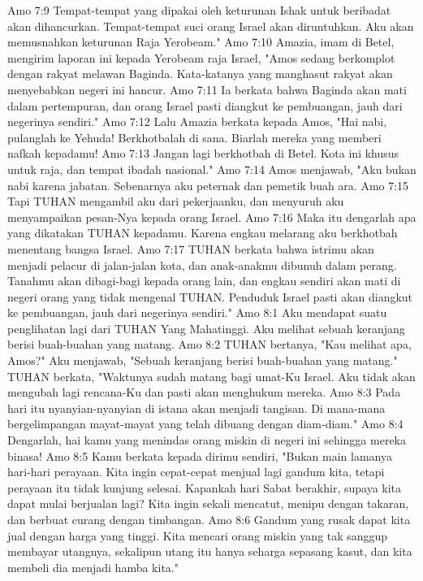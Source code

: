 Amo 7:9  Tempat-tempat yang dipakai oleh keturunan Ishak untuk beribadat akan dihancurkan. Tempat-tempat suci orang Israel akan diruntuhkan. Aku akan memusnahkan keturunan Raja Yerobeam."
Amo 7:10  Amazia, imam di Betel, mengirim laporan ini kepada Yerobeam raja Israel, "Amos sedang berkomplot dengan rakyat melawan Baginda. Kata-katanya yang manghasut rakyat akan menyebabkan negeri ini hancur.
Amo 7:11  Ia berkata bahwa Baginda akan mati dalam pertempuran, dan orang Israel pasti diangkut ke pembuangan, jauh dari negerinya sendiri."
Amo 7:12  Lalu Amazia berkata kepada Amos, "Hai nabi, pulanglah ke Yehuda! Berkhotbalah di sana. Biarlah mereka yang memberi nafkah kepadamu!
Amo 7:13  Jangan lagi berkhotbah di Betel. Kota ini khusus untuk raja, dan tempat ibadah nasional."
Amo 7:14  Amos menjawab, "Aku bukan nabi karena jabatan. Sebenarnya aku peternak dan pemetik buah ara.
Amo 7:15  Tapi TUHAN mengambil aku dari pekerjaanku, dan menyuruh aku menyampaikan pesan-Nya kepada orang Israel.
Amo 7:16  Maka itu dengarlah apa yang dikatakan TUHAN kepadamu. Karena engkau melarang aku berkhotbah menentang bangsa Israel.
Amo 7:17  TUHAN berkata bahwa istrimu akan menjadi pelacur di jalan-jalan kota, dan anak-anakmu dibunuh dalam perang. Tanahmu akan dibagi-bagi kepada orang lain, dan engkau sendiri akan mati di negeri orang yang tidak mengenal TUHAN. Penduduk Israel pasti akan diangkut ke pembuangan, jauh dari negerinya sendiri."
Amo 8:1  Aku mendapat suatu penglihatan lagi dari TUHAN Yang Mahatinggi. Aku melihat sebuah keranjang berisi buah-buahan yang matang.
Amo 8:2  TUHAN bertanya, "Kau melihat apa, Amos?" Aku menjawab, "Sebuah keranjang berisi buah-buahan yang matang." TUHAN berkata, "Waktunya sudah matang bagi umat-Ku Israel. Aku tidak akan mengubah lagi rencana-Ku dan pasti akan menghukum mereka.
Amo 8:3  Pada hari itu nyanyian-nyanyian di istana akan menjadi tangisan. Di mana-mana bergelimpangan mayat-mayat yang telah dibuang dengan diam-diam."
Amo 8:4  Dengarlah, hai kamu yang menindas orang miskin di negeri ini sehingga mereka binasa!
Amo 8:5  Kamu berkata kepada dirimu sendiri, "Bukan main lamanya hari-hari perayaan. Kita ingin cepat-cepat menjual lagi gandum kita, tetapi perayaan itu tidak kunjung selesai. Kapankah hari Sabat berakhir, supaya kita dapat mulai berjualan lagi? Kita ingin sekali mencatut, menipu dengan takaran, dan berbuat curang dengan timbangan.
Amo 8:6  Gandum yang rusak dapat kita jual dengan harga yang tinggi. Kita mencari orang miskin yang tak sanggup membayar utangnya, sekalipun utang itu hanya seharga sepasang kasut, dan kita membeli dia menjadi hamba kita."
